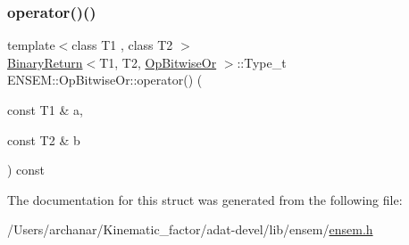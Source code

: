 \subsubsection{\texorpdfstring{operator()()}{operator()()}\hspace{0.1cm}{\footnotesize\ttfamily [3/3]}}
{\footnotesize\ttfamily template$<$class T1 , class T2 $>$ \\
\mbox{\hyperlink{structENSEM_1_1BinaryReturn}{Binary\+Return}}$<$T1, T2, \mbox{\hyperlink{structENSEM_1_1OpBitwiseOr}{Op\+Bitwise\+Or}} $>$\+::Type\+\_\+t E\+N\+S\+E\+M\+::\+Op\+Bitwise\+Or\+::operator() (\begin{DoxyParamCaption}\item[{const T1 \&}]{a,  }\item[{const T2 \&}]{b }\end{DoxyParamCaption}) const\hspace{0.3cm}{\ttfamily [inline]}}



The documentation for this struct was generated from the following file\+:\begin{DoxyCompactItemize}
\item 
/\+Users/archanar/\+Kinematic\+\_\+factor/adat-\/devel/lib/ensem/\mbox{\hyperlink{adat-devel_2lib_2ensem_2ensem_8h}{ensem.\+h}}\end{DoxyCompactItemize}
